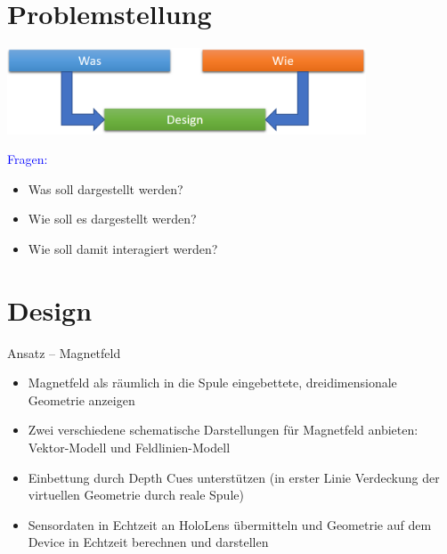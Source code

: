 \part{Problemstellung}
\label{part:golas}
\begin{frame}
\vspace{-1em}
\begin{center}
	\includegraphics[width=0.8\textwidth]{images/Informiertes_Design.png}	
\end{center}
\textcolor{blue}{Fragen:}
\begin{itemize}
	\item Was soll dargestellt werden?
	\item Wie soll es dargestellt werden?
	\item Wie soll damit interagiert werden?
\end{itemize}
\vspace{50px}
\end{frame}


\part{Design}
\label{part:design}
\begin{frame}[fragile]{Ansatz -- Magnetfeld}
\begin{itemize}
	\item Magnetfeld als räumlich in die Spule eingebettete, dreidimensionale Geometrie anzeigen
	\item Zwei verschiedene schematische Darstellungen für Magnetfeld anbieten: Vektor-Modell und Feldlinien-Modell
	\item Einbettung durch Depth Cues unterstützen (in erster Linie Verdeckung der virtuellen Geometrie durch reale Spule)
	\item Sensordaten in Echtzeit an HoloLens übermitteln und Geometrie auf dem Device in Echtzeit berechnen und darstellen
\end{itemize}
\end{frame}

